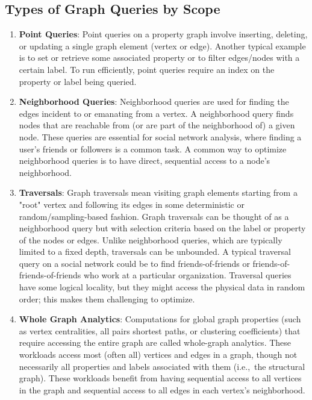 \subsection{Types of Graph Queries by Scope}
\label{back:workloads:oltp}
\begin{enumerate}
    \item \textbf{Point Queries}: Point queries on a property graph involve inserting, deleting, or updating a single graph element (vertex or edge). Another typical example is to set or retrieve some associated property or to filter edges/nodes with a certain label. To run efficiently, point queries require an index on the property or label being queried.

    \item \textbf{Neighborhood Queries}: Neighborhood queries are used for finding the edges incident to or emanating from a vertex. A neighborhood query finds nodes that are reachable from (or are part of the neighborhood of) a given node. These queries are essential for social network analysis, where finding a user's friends or followers is a common task. A common way to optimize neighborhood queries is to have direct, sequential access to a node's neighborhood.

    \item \textbf{Traversals}: Graph traversals mean visiting graph elements starting from a "root" vertex and following its edges in some deterministic or random/sampling-based fashion.  Graph traversals can be thought of as a neighborhood query but with selection criteria based on the label or property of the nodes or edges. Unlike neighborhood queries, which are typically limited to a fixed depth, traversals can be unbounded. A typical traversal query on a social network could be to find friends-of-friends or friends-of-friends-of-friends who work at a particular organization. Traversal queries have some logical locality, but they might access the physical data in random order; this makes them challenging to optimize.
    
    \item \textbf{Whole Graph Analytics}: Computations for global graph properties (such as vertex centralities, all pairs shortest paths, or clustering coefficients) that require accessing the entire graph are called whole-graph analytics. These workloads access most (often all) vertices and edges in a graph, though not necessarily all properties and labels associated with them (i.e.,\ the structural graph). These workloads benefit from having sequential access to all vertices in the graph and sequential access to all edges in each vertex's neighborhood.
    
\end{enumerate}

